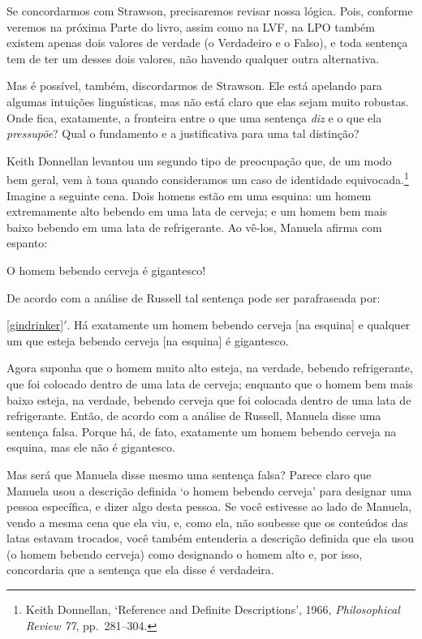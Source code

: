 Se concordarmos com Strawson, precisaremos revisar nossa lógica.
Pois, conforme veremos na próxima Parte do livro, assim como na LVF, na LPO também existem apenas dois valores de verdade (o Verdadeiro e o Falso), e toda sentença tem de ter um desses dois valores, não havendo qualquer outra alternativa.

Mas é possível, também, discordarmos de Strawson.
Ele está apelando para algumas intuições linguísticas, mas não está claro que elas sejam muito robustas.
Onde fica, exatamente, a fronteira entre o que uma sentença \emph{diz} e o que ela \emph{pressupõe}?
Qual o fundamento e a justificativa para uma tal distinção?

Keith Donnellan levantou um segundo tipo de preocupação que, de um modo bem geral, vem à tona quando consideramos um caso de identidade equivocada.\footnote{
	Keith Donnellan, `Reference and Definite Descriptions', 1966, \emph{Philosophical Review 77}, pp.\ 281--304.}
Imagine a seguinte cena.
Dois homens estão em uma esquina: um homem extremamente alto bebendo em  uma lata de cerveja; e um homem bem mais baixo bebendo em uma lata de refrigerante.
Ao vê-los, Manuela afirma com espanto:

	\begin{earg}
		\item[\ex{gindrinker}] O homem bebendo cerveja é gigantesco!
	\end{earg}
De acordo com a análise de Russell tal sentença pode ser parafraseada por:
	\begin{earg}
		\item[\ref{gindrinker}$'$.] Há exatamente um homem bebendo cerveja [na esquina] e qualquer um que esteja bebendo cerveja [na esquina] é gigantesco.		
	\end{earg}
Agora suponha que o homem muito alto esteja, na verdade, bebendo refrigerante, que foi colocado dentro de uma lata de cerveja; enquanto que o homem bem mais baixo esteja, na verdade, bebendo cerveja que foi colocada dentro de uma lata de refrigerante.
Então, de acordo com a análise de Russell, Manuela disse uma sentença falsa.
Porque há, de fato, exatamente um homem bebendo cerveja na esquina, mas ele não é gigantesco.

Mas será que Manuela disse mesmo uma sentença falsa?
Parece claro que Manuela usou a descrição definida `o homem bebendo cerveja' para designar uma pessoa específica, e dizer algo desta pessoa.
Se você estivesse ao lado de Manuela, vendo a mesma cena que ela viu, e, como ela, não soubesse que os conteúdos das latas estavam trocados, você também  entenderia a descrição definida que ela usou (o homem bebendo cerveja) como designando o homem alto e, por isso, concordaria que a sentença que ela disse é verdadeira.

